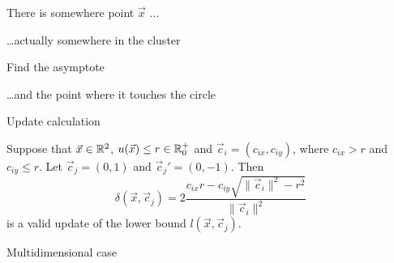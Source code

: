 \documentclass[10pt, compress]{beamer}
\newcommand{\x}{\vec{x}}
\newcommand{\cj}{\vec{c}_j}
\newcommand{\ci}{\vec{c}_i}
\newcommand{\ux}{u(\x)}
\newcommand{\lxcj}{l(\x, \cj)}
\newcommand{\deltaxcj}{\delta(\x, \cj)}
\begin{document}
\begin{frame}{There is somewhere point $\x$ ...}
  \begin{center}
    
  \end{center}
\end{frame}

\begin{frame}{\ldots actually somewhere in the cluster}
  \begin{center}
    
  \end{center}
\end{frame}

\begin{frame}{Find the asymptote}
  \begin{center}
    
  \end{center}
\end{frame}

\begin{frame}{\ldots and the point where it touches the circle}
  \begin{center}
    
  \end{center}
\end{frame}

\begin{frame}{Update calculation}
\vspace{-0.5cm}
\begin{lemma}
Suppose that $\x \in \R^2$, $\ux \leq r \in \Rpz$ and $\ci = (c_{ix}, c_{iy})$,
where $c_{ix} > r$ and $c_{iy} \leq r$. Let $\cj=(0,1)$ and $\cj'=(0,-1)$. Then
\begin{equation*}
    \deltaxcj =
        2\frac{
            c_{ix} r
            -
            c_{iy} \sqrt{\| \ci \|^2 - r^2}
        }{
             \| \ci \|^2
        }
\end{equation*}
is a valid update of the lower bound $\lxcj$.
\end{lemma}
  \begin{center}
    
  \end{center}
\end{frame}

\begin{frame}{Multidimensional case}
  \begin{center}
    
  \end{center}
\end{frame}
\end{document}
